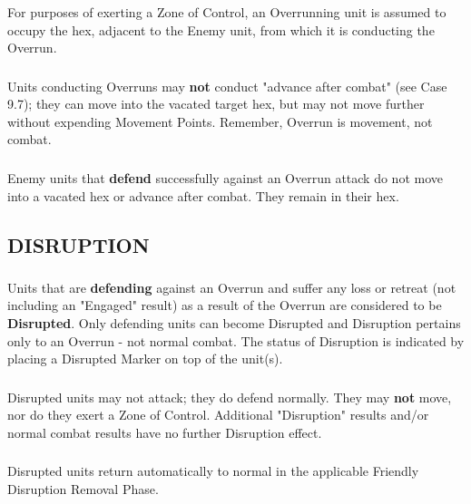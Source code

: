 \begingroup
\color{blue}
\subsubsection{} For purposes of exerting a Zone of Control, an Overrunning unit is assumed to occupy the hex, adjacent to the Enemy unit, from which it is conducting the Overrun.
\endgroup

\subsubsection{} Units conducting Overruns may \textbf{not} conduct "advance after combat" (see Case 9.7); they can move into the vacated target hex, but may not move further without expending Movement Points. Remember, Overrun is movement, not combat.

\subsubsection{} Enemy units that \textbf{defend} successfully against an Overrun attack do not move into a vacated hex or advance after combat. They remain in their hex.

\subsection{DISRUPTION}

\subsubsection{} Units that are \textbf{defending} against an Overrun and suffer any loss or retreat (not including an "Engaged" result) as a result of the Overrun are considered to be \textbf{Disrupted}. Only defending units can become Disrupted and Disruption pertains only to an Overrun - not normal combat. The status of Disruption is indicated by placing a Disrupted Marker on top of the unit(s).

\subsubsection{} Disrupted units may not attack; they do defend normally. They may \textbf{not} move, nor do they exert a Zone of Control. Additional "Disruption" results and/or normal combat results have no further Disruption effect.

\subsubsection{} Disrupted units return automatically to normal in the applicable Friendly Disruption Removal Phase.

